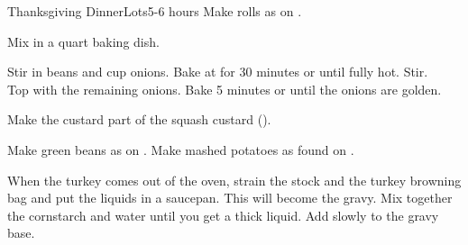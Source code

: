\documentclass[../Cookbook.tex]{subfiles}
\begin{document}
\begin{recipe}{Thanksgiving Dinner}{Lots}{5-6 hours}
\newstep
Make rolls as on .

Mix in a  quart baking dish.

Stir in beans and  cup onions. Bake at  for 30 minutes or until fully hot. Stir.\\
Top with the remaining onions. Bake 5 minutes or until the onions are golden.

\newstep
Make the custard part of the squash custard ().

\newstep
Make green beans as on .
Make mashed potatoes as found on .

When the turkey comes out of the oven, strain the stock and the turkey browning bag and put the liquids in a saucepan. This will become the gravy. Mix together the cornstarch and water until you get a thick liquid. Add slowly to the gravy base.

\end{recipe}
\end{document}
